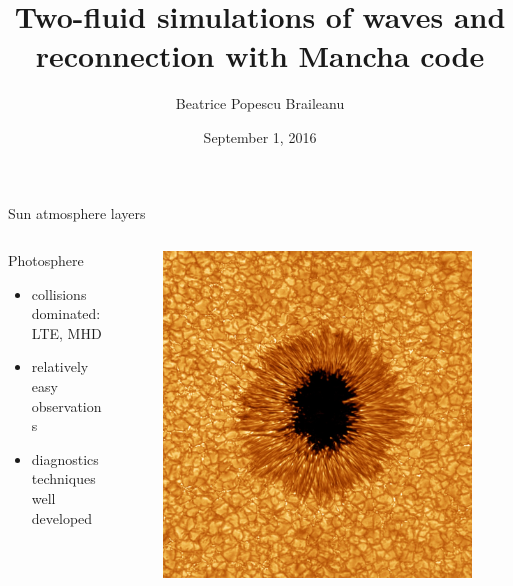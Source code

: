 \documentclass{beamer}
\begin{document}
\title[3d]  
{Two-fluid simulations of waves and reconnection with Mancha code}
\author[]{Beatrice Popescu Braileanu }
\date{September 1, 2016}

\begin{frame}
\maketitle
\end{frame}

\begin{frame}[t]{Sun atmosphere layers}
\vspace*{-22pt}
\begin{columns}[b]
    \begin{column}{0.6\textwidth}
		Photosphere
        \begin{itemize}
					\item collisions dominated: LTE, MHD 
					\item	relatively easy observations 
					\item	diagnostics techniques well developed 
        \end{itemize}
    \end{column}
    \begin{column}{0.5\textwidth}
			\begin{figure}[t]
			 \includegraphics[scale=0.08]{phot.jpg}
			\end{figure}
    \end{column}
\end{columns}


\end{frame}
\end{document}
